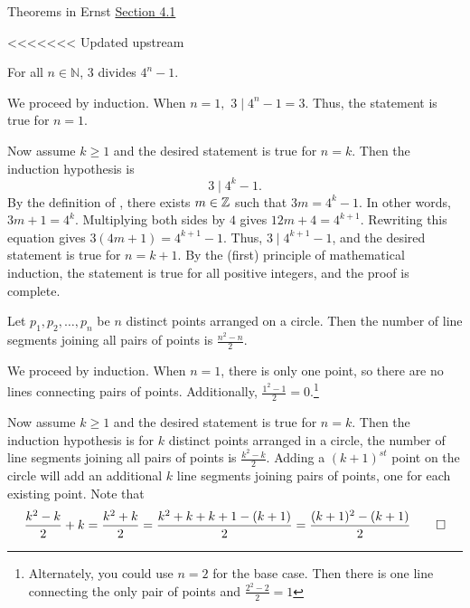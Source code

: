 \documentclass{ximera}
\begin{document}
\begin{br}
Theorems in Ernst \href{https://danaernst.com/IBL-IntroToProof/pretext/sec_Intro_to_Induction.html}{Section 4.1} 
 

<<<<<<< Updated upstream
\begin{theorem}
For all $n\in\mathbb{N}$, 3 divides $4^{n}-1$.
\end{theorem}
\begin{solution}
We proceed by induction.  When $n=1,$ $3\mid 4^n-1=3$. Thus, the statement is true for $n=1.$

Now assume $k\geq 1$ and the desired statement is true for $n=k$. Then the induction hypothesis is \[3\mid 4^k-1.\]
By the definition of , there exists $m\in\mathbb Z$ such that $3m=4^k-1.$ In other words, $3m+1=4^k$. Multiplying both sides by $4$ gives $12m+4=4^{k+1}$. Rewriting this equation gives $3(4m+1)=4^{k+1}-1$. Thus, $3\mid 4^{k+1}-1$, and the desired statement is true for $n=k+1$. By the (first) principle of mathematical induction, the statement is true for all positive integers, and the proof is complete.
\end{solution}

 \begin{theorem}
 Let $p_{1}, p_{2}, \ldots, p_{n}$ be $n$ distinct points arranged on a circle.  Then the number of line segments joining all pairs of points is $\frac{n^{2}-n}{2}$.
 \end{theorem}
\begin{solution}
 We proceed by induction. When $n=1$, there is only one point, so there are no lines connecting pairs of points. Additionally, $\frac{1^2-1}{2}=0$.\footnote{Alternately, you could use $n=2$ for the base case. Then there is one line connecting the only pair of points and $\frac{2^2-2}{2}=1$}
 
 Now assume $k\geq 1$ and the desired statement is true for $n=k$. Then the induction hypothesis is for $k$ distinct points arranged in a circle, the number of line segments joining all pairs of points is $\frac{k^{2}-k}{2}$. Adding a $(k+1)^{st}$ point on the circle will add an additional $k$ line segments joining pairs of points, one for each existing point. Note that 
 \[ 
 	\frac{k^{2}-k}{2}+k=\frac{k^{2}+k}{2}=
	\frac{k^2+k+k+1-(k+1)}{2}=\frac{(k+1)^{2}-(k+1)}{2}\qedhere
 \]
\end{solution}
\end{br}
\end{document}
